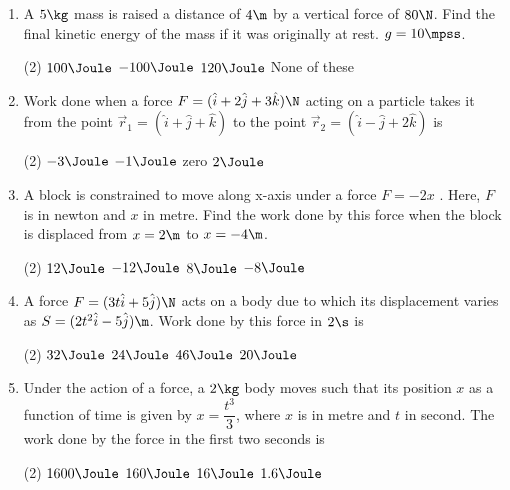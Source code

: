 \documentclass{article}
\begin{document}
\begin{enumerate}
\item A $5\kg$ mass is raised a distance of $4\m$ by a vertical force of $80\N$. Find the final kinetic energy of the mass if it was originally at rest. $g = 10\mpss$.
\begin{tasks}(2)
	\task $100\Joule$
	\task $-100\Joule$
	\task $120\Joule$\ans
	\task None of these
\end{tasks}

\item Work done when a force $F=(\hat{i}+2\hat{j}+3\hat{k})\N$ acting on a particle takes it from the point $\vec{r}_1 = (\hat{i} + \hat{j} + \hat{k} )$ to the point $\vec{r}_2 = (\hat{i} - \hat{j} + 2 \hat{k} )$ is
\begin{tasks}(2)
	\task $-3\Joule$
	\task $-1\Joule$\ans
	\task zero
	\task $2\Joule$
\end{tasks}


\item A block is constrained to move along x-axis under a force $F = - 2x$ . Here, $F$ is in newton and $x$ in
metre. Find the work done by this force when the block is displaced from $x = 2 \m$ to $x = - 4 \m$.
\begin{center}
\end{center}
\begin{tasks}(2)
	\task $12\Joule$
	\task $-12\Joule$\ans
	\task $8\Joule$
	\task $-8\Joule$
\end{tasks}

\item A force $F=(3t\hat{i}+5\hat{j})\N$ acts on a body due to which its displacement varies as $S=(2t^2\hat{i}-5\hat{j})\m$. Work done by this force in $2\s$ is
\begin{tasks}(2)
	\task $32\Joule$\ans
	\task $24\Joule$
	\task $46\Joule$
	\task $20\Joule$
\end{tasks}

\item Under the action of a force, a $2 \kg$ body moves such that its position $x$ as a function of time is given by $x=\dfrac{t^3}{3}$, where $x$ is in metre and $t$ in second. The work done by the force in the first two seconds is
\begin{tasks}(2)
	\task $1600\Joule$
	\task $160\Joule$
	\task $16\Joule$\ans
	\task $1.6\Joule$
\end{tasks}


\end{enumerate}
\end{document}
